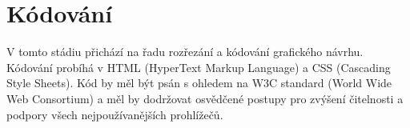 \section{Kódování}
\label{sec:coding}

V tomto stádiu přichází na řadu rozřezání a kódování grafického návrhu. Kódování probíhá v HTML (HyperText Markup Language) a CSS (Cascading Style Sheets). Kód by měl být psán s ohledem na W3C standard (World Wide Web Consortium) a měl by dodržovat osvědčené postupy pro zvýšení čitelnosti a podpory všech nejpoužívanějších prohlížečů.
